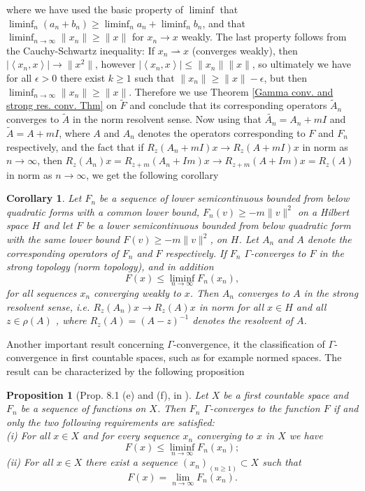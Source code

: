 \documentclass[a4paper,11pt]{article}
\renewcommand{\braket}[1]{\left\langle#1\right\rangle}
\newcommand{\ie}{\emph{i.e.} }
\newtheorem{proposition}{Proposition}
\newtheorem{corollary}{Corollary}
\numberwithin{equation}{section}
\begin{document}
where we have used the basic property of $ \liminf $ that $ \liminf_n(a_n+b_n)\geq\liminf_na_n+\liminf_n b_n $, and that $ \liminf_{n\to\infty}\|x_n\|\geq\|x\| $ for $ x_n\to x $ weakly. The last property follows from the  Cauchy-Schwartz inequality: If $ x_n \rightharpoonup x$ (converges weakly), then $ |\braket{x_n,x}|\to\|x^2\| $, however $ |\braket{x_n,x}|\leq\|x_n\|\|x\| $, so ultimately we have for all $ \epsilon>0 $ there exist $ k\geq1 $ such that $ \|x_n\|\geq\|x\|-\epsilon $, but then $ \liminf_{n\to\infty}\|x_n\|\geq\|x\| $. Therefore we use Theorem \ref{Gamma conv. and strong res. conv. Thm} on $ \tilde{F} $ and conclude that its corresponding operators $ \tilde{A}_n $ converges to $ \tilde{A} $ in the norm resolvent sense. Now using that $ \tilde{A_n}=A_n+mI $ and $ \tilde{A}=A+mI $, where $ A $ and $ A_n $ denotes the operators corresponding to $ F $ and $ F_n $ respectively, and the fact that if $ R_z(A_n+mI)x\to R_z(A+mI)x $ in norm as $ n\to\infty $, then $ R_z(A_n)x=R_{z+m}(A_n+Im)x\to R_{z+m}(A+Im)x=R_z(A) $ in norm as $ n\to\infty $, we get the following corollary
\begin{corollary}\label{Gamma conv. and strong res. conv. Col}
	Let $ F_n $ be a sequence of lower semicontinuous bounded from below quadratic forms with a common lower bound, $ F_n(v)\geq-m\|v\|^2 $ on a Hilbert space $ H $ and let $ F $ be a lower semicontinuous bounded from below quadratic form with the same lower bound $ F(v)\geq-m\|v\|^2 $, on $ H $. Let $ A_n $ and $ A $ denote the corresponding operators of $ F_n $ and $ F $ respectively. If $ F_n $ $ \Gamma $-converges to $ F $ in the strong topology (norm topology), and in addition \begin{equation}
	F(x)\leq\liminf_{n\to\infty}F_n(x_n),
	\end{equation}
	for all sequences $ x_n $ converging weakly to $ x $. Then $ A_n $ converges to $ A $ in the strong resolvent sense, \ie $ R_z(A_n)x\to R_z(A)x $ in norm for all $ x\in H $ and all $ z\in\rho(A)$ , where $ R_z(A)=(A-z)^{-1} $ denotes the resolvent of $ A $.
\end{corollary}
Another important result concerning $ \Gamma $-convergence, it the classification of $ \Gamma $-convergence in first countable spaces, such as for example normed spaces. The result can be characterized by the following proposition
\begin{proposition}[Prop. 8.1 (e) and (f), in \cite{maso1993introduction}]\label{Gamma conv. first countable. prop}
	Let $ X $ be a first countable space and $ F_n $ be a sequence of functions on $ X $. Then $ F_n $ $ \Gamma $-converges to the function $ F $ if and only the two following requirements are satisfied:\\
	(i) For all $ x\in X $ and for every sequence $ x_n $ converging to $ x $ in $ X $ we have \begin{equation}
	F(x)\leq\liminf_{n\to\infty}F_n(x_n);
	\end{equation}
	(ii) For all $ x\in X $ there exist a sequence $ (x_n)_(n\geq1)\subset X $ such that \begin{equation}
	F(x)=\lim\limits_{n\to\infty}F_n(x_n).
	\end{equation}
\end{proposition}
\end{document}

